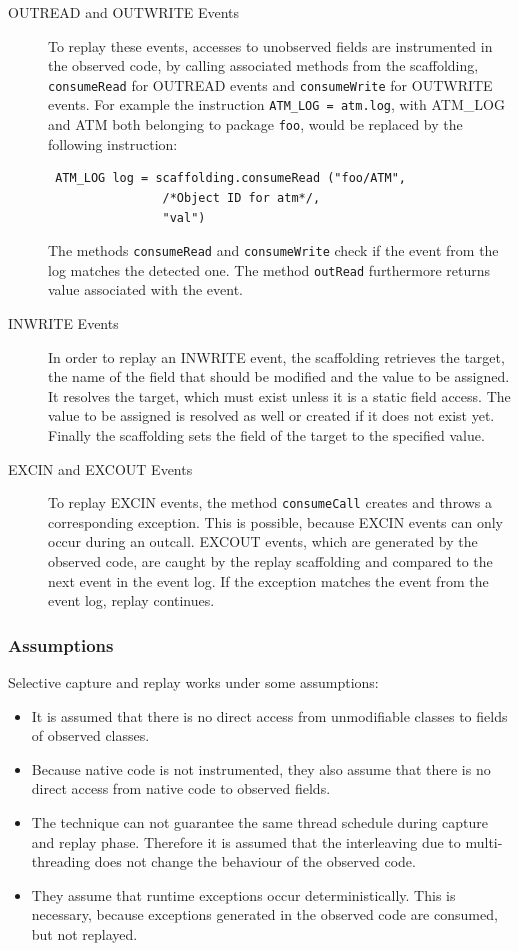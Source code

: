 \begin{description}
 \item [OUTREAD and OUTWRITE Events] To replay these events, accesses to unobserved fields are instrumented in the observed code, by calling associated methods from the scaffolding, \texttt{consumeRead} for OUTREAD events and \texttt{consumeWrite} for OUTWRITE events. For example the instruction \texttt{ATM\_LOG = atm.log}, with ATM\_LOG and ATM both belonging to package \texttt{foo}, would be replaced by the following instruction:
\begin{lstlisting}
 ATM_LOG log = scaffolding.consumeRead ("foo/ATM",
                /*Object ID for atm*/,
                "val")
\end{lstlisting}
The methods \texttt{consumeRead} and \texttt{consumeWrite} check if the event from the log matches the detected one. The method \texttt{outRead} furthermore returns value associated with the event.
 \item [INWRITE Events] In order to replay an INWRITE event, the scaffolding retrieves the target, the name of the field that should be modified and the value to be assigned. It resolves the target, which must exist unless it is a static field access. The value to be assigned is resolved as well or created if it does not exist yet. Finally the scaffolding sets the field of the target to the specified value.
 \item [EXCIN and EXCOUT Events]  To replay EXCIN events, the method \texttt{consumeCall} creates and throws a corresponding exception. This is possible, because EXCIN events can only occur during an outcall. EXCOUT events, which are generated by the observed code, are caught by the replay scaffolding and compared to the next event in the event log. If the exception matches the event from the event log, replay continues.
\end{description}

\subsubsection{Assumptions}
Selective capture and replay works under some assumptions:
\begin{itemize}
 \item It is assumed that there is no direct access from unmodifiable classes to fields of observed classes.
 \item Because native code is not instrumented, they also assume that there is no direct access from native code to observed fields.
 \item The technique can not guarantee the same thread schedule during capture and replay phase. Therefore it is assumed that the interleaving due to multi-threading does not change the behaviour of the observed code.
 \item They assume that runtime exceptions occur deterministically. This is necessary, because exceptions generated in the observed code are consumed, but not replayed.
\end{itemize}

